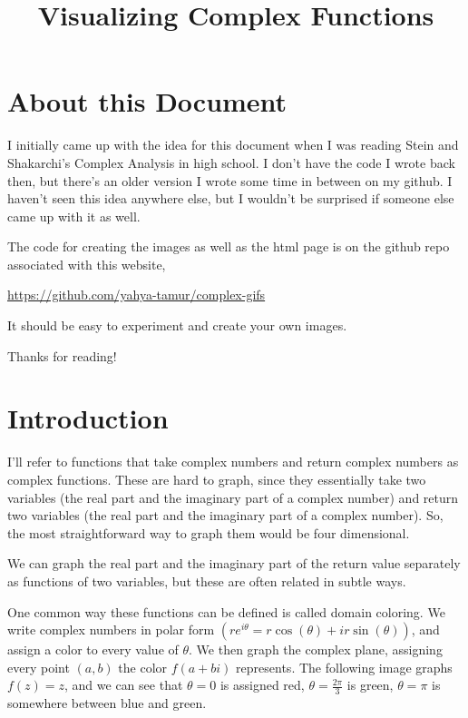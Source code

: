 \documentclass[xhtml, mathjax]{article}
\title{Visualizing Complex Functions}
\author{}
\date{}
\begin{document}
  \EndCssFile


  \section{About this Document}

    I initially came up with the idea for this document when I was reading Stein
    and Shakarchi's Complex Analysis in high school. I don't have the code I
    wrote back then, but there's an older version I wrote some time in between
    on my github. I haven't seen this idea anywhere else, but I wouldn't be
    surprised if someone else came up with it as well.

    The code for creating the images as well as the html page is on the github
    repo associated with this website,

    \url{https://github.com/yahya-tamur/complex-gifs}

    It should be easy to experiment and create your own images.

    Thanks for reading!

  \section{Introduction}

    I'll refer to functions that take complex numbers and return complex numbers
    as complex functions. These are hard to graph, since they essentially take
    two variables (the real part and the imaginary part of a complex number) and
    return two variables (the real part and the imaginary part of a complex
    number). So, the most straightforward way to graph them would be four
    dimensional.

    We can graph the real part and the imaginary part of the return value
    separately as functions of two variables, but these are often related in
    subtle ways.

    One common way these functions can be defined is called domain coloring. We
    write complex numbers in polar form $(re^{i\theta} = r\cos(\theta) +
    ir\sin(\theta))$, and assign a color to every value of $\theta$. We then
    graph the complex plane, assigning every point $(a,b)$ the color $f(a + bi)$
    represents. The following image graphs $f(z) = z$, and we can see that
    $\theta = 0$ is assigned red, $\theta
    = \frac{2\pi}{3}$ is green, $\theta = \pi$ is somewhere between blue and
    green.
\end{document}
